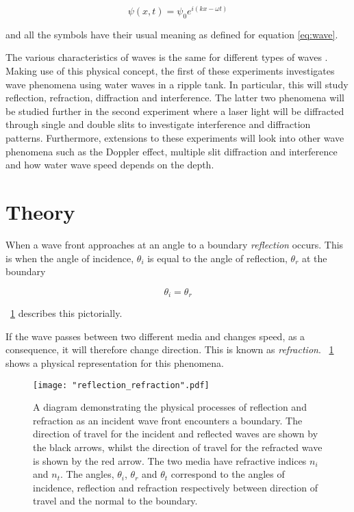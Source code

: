 \documentclass{article}
\newcommand{\figref}[2][\figurename~]{#1\ref{#2}}
\begin{document}
\begin{equation}
\label{eq:complex-wave}
\psi(x, t) = \psi_0 e^{i(kx - \omega t)}
\end{equation}

\vspace{2mm}
\noindent
and all the symbols have their usual meaning as defined for equation \eqref{eq:wave}.

\vspace{2mm}
\noindent
The various characteristics of waves is the same for different types of waves \cite{Paper01}. Making use of this physical concept, the first of these experiments investigates wave phenomena using water waves in a ripple tank. In particular, this will study reflection, refraction, diffraction and interference. The latter two phenomena will be studied further in the second experiment where a laser light will be diffracted through single and double slits to investigate interference and diffraction patterns. Furthermore, extensions to these experiments will look into other wave phenomena such as the Doppler effect, multiple slit diffraction and interference and how water wave speed depends on the depth.


\section{Theory}
\label{sec:theory}

When a wave front approaches at an angle to a boundary \textit{reflection} occurs. This is when the angle of incidence, $\theta_i$ is equal to the angle of reflection, $\theta_r$ at the boundary

\begin{equation}
\label{eq:reflection}
\theta_i = \theta_r
\end{equation}

\vspace{2mm}
\noindent
\figref{fig:reflection_refraction} describes this pictorially.

\vspace{2mm}
\noindent
If the wave passes between two different media and changes speed, as a consequence, it will therefore change direction. This is known as \textit{refraction}. \figref{fig:reflection_refraction} shows a physical representation for this phenomena.

\begin{figure}[h]
\centering
\texttt{[image: "reflection\_refraction".pdf]}
\caption{A diagram demonstrating the physical processes of reflection and refraction as an incident wave front encounters a boundary. The direction of travel for the incident and reflected waves are shown by the black arrows, whilst the direction of travel for the refracted wave is shown by the red arrow. The two media have refractive indices $n_i$ and $n_t$. The angles, $\theta_i$, $\theta_r$ and $\theta_t$ correspond to the angles of incidence, reflection and refraction respectively between direction of travel and the normal to the boundary.}
\label{fig:reflection_refraction}
\end{figure}
\end{document}
